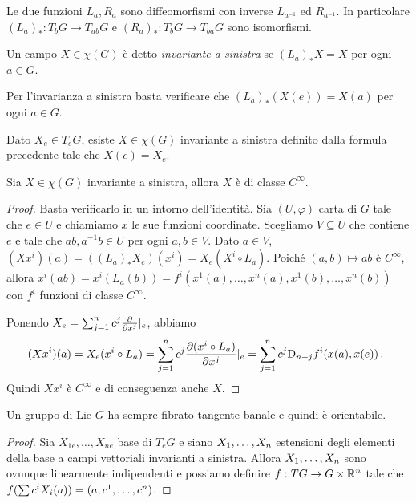 Le due funzioni $L_a,R_a$ sono diffeomorfismi con inverse $L_{a^{-1}}$ ed $R_{a^{-1}}$.
In particolare $(L_a)_* : T_bG \to T_{ab} G$ e $(R_a)_* : T_bG \to T_{ba} G$ sono isomorfismi.


\begin{definition}
	Un campo $X\in\chi(G)$ è detto \emph{invariante a sinistra} se $(L_a)_*X=X$ per ogni $a\in G$.
\end{definition}

\begin{remark}
	Per l'invarianza a sinistra basta verificare che $(L_a)_*(X(e)) = X(a)$ per ogni $a\in G$.
\end{remark}

Dato $X_e \in T_eG$, esiste $X\in\chi(G)$ invariante a sinistra definito dalla formula precedente tale che $X(e) = X_e$.


\begin{proposition}
	Sia $X \in \chi(G)$ invariante a sinistra, allora $X$ è di classe $C^\infty$.
\end{proposition}
\begin{proof}
	Basta verificarlo in un intorno dell'identità. Sia $(U,\varphi)$ carta di $G$ tale che $e\in U$ e chiamiamo $x$ le sue funzioni coordinate. Scegliamo $V\subseteq U$ che contiene $e$ e tale che $a b, a^{-1}b \in U$ per ogni $a,b\in V$.
	Dato $a\in V$, $(Xx^i)(a) = ((L_a)_* X_e) (x^i) = X_e (X^i\circ L_a)$.
	Poiché $(a,b) \mapsto ab$ è $C^\infty$, allora $x^i(ab) = x^i( L_a(b) ) = f^i(x^1(a),\ldots, x^n(a), x^1(b), \ldots, x^n(b) )$ con $f^i$ funzioni di classe $C^\infty$.
	
	Ponendo $X_e = \sum_{j=1}^n c^j \DerParz{}{x^j}\restrict e$, abbiamo
	\begin{equation*}
	(X x^i) (a) = X_e (x^i \circ L_a) = \sum_{j=1}^n c^j \DerParz{(x^i\circ L_a)}{x^j} \restrict e = 
	\sum_{j=1}^n c^j \Diff_{n+j} f^i(x(a), x(e))\punto
	\end{equation*}
	Quindi $Xx^i$ è $C^\infty$ e di conseguenza anche $X$.
\end{proof}

\begin{corollary}
	Un gruppo di Lie $G$ ha sempre fibrato tangente banale e quindi è orientabile.
\end{corollary}
\begin{proof}
	Sia $X_{1e},\ldots,X_{ne}$ base di $T_eG$ e siano $\seqb Xn,$ estensioni degli elementi della base a campi vettoriali invarianti a sinistra. Allora $\seqb Xn,$ sono ovunque linearmente indipendenti e possiamo definire $f:TG \to G\times \R^n$ tale che $f(\sum c^iX_i(a)) = (a,\seqa cn,)$.
\end{proof}

